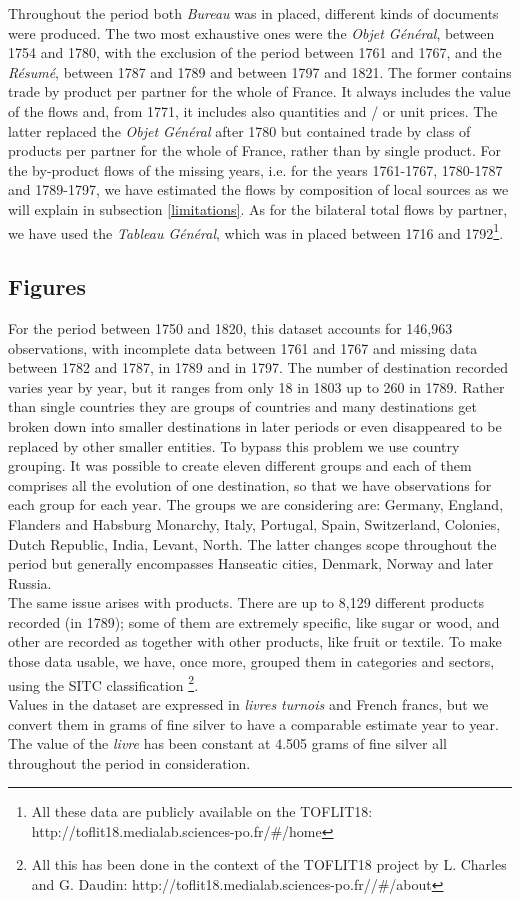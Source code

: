 \documentclass[12pt,a4paper,notitlepage,english]{article}
\begin{document}
Throughout the period both \textit{Bureau} was in placed, different kinds of documents were produced. The two most exhaustive ones were the \textit{Objet Général}, between 1754 and 1780, with the exclusion of the period between 1761 and 1767, and the \textit{Résumé}, between 1787 and 1789 and between 1797 and 1821. The former contains trade by product per partner for the whole of France. It always includes the value of the flows and, from 1771, it includes also quantities and / or unit prices. The latter replaced the \textit{Objet Général} after 1780 but contained trade by class of products per partner for the whole of France, rather than by single product. For the by-product flows of the missing years, i.e. for the years 1761-1767, 1780-1787 and 1789-1797, we have estimated the flows by composition of local sources as we will explain in subsection \ref{limitations}. As for the bilateral total flows by partner, we have used the \textit{Tableau Général}, which was in placed between 1716 and 1792\footnote{All these data are publicly available on the TOFLIT18: http://toflit18.medialab.sciences-po.fr/\#/home }. 

\subsection{Figures} \label{figures}
For the period between 1750 and 1820, this dataset accounts for 146,963 observations, with incomplete data between 1761 and 1767 and missing data between 1782 and 1787, in 1789 and in 1797. The number of destination recorded varies year by year, but it ranges from only 18 in 1803 up to 260 in 1789. Rather than single countries they are groups of countries and many destinations get broken down into smaller destinations in later periods or even disappeared to be replaced by other smaller entities. To bypass this problem we use country grouping. It was possible to create eleven different groups and each of them comprises all the evolution of one destination, so that we have observations for each group for each year. The groups we are considering are: Germany, England, Flanders and Habsburg Monarchy, Italy, Portugal, Spain, Switzerland, Colonies, Dutch Republic, India, Levant, North. The latter changes scope throughout the period but generally encompasses Hanseatic cities, Denmark, Norway and later Russia. \\
The same issue arises with products. There are up to 8,129 different  products recorded (in 1789); some of them are extremely specific, like sugar or wood, and other are recorded as together with other products, like fruit or textile. To make those data usable, we have, once more, grouped them in categories and sectors, using the SITC classification \footnote{All this has been done in the context of the TOFLIT18 project by  L. Charles and G. Daudin: http://toflit18.medialab.sciences-po.fr//\#/about}.  \\
Values in the dataset are expressed in \textit{livres turnois} and French francs, but we convert them in grams of fine silver to have a comparable estimate year to year. The value of the \textit{livre} has been constant at 4.505 grams of fine silver all throughout the period in consideration.
\end{document}
